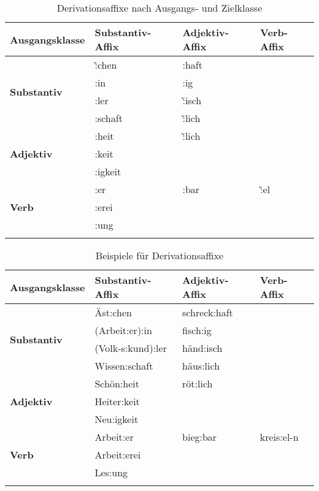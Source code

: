 \begin{table}
  \centering
  \begin{tabular}{llll}
    \lsptoprule
    \textbf{Ausgangsklasse} & \textbf{Substantiv-Affix} & \textbf{Adjektiv-Affix} & \textbf{Verb-Affix} \\
   \midrule
   \multirow{4}{*}{\textbf{Substantiv}} & \~:chen & :haft & \\
   & :in & :ig & \\
   & :ler & \~:isch & \\
   & :schaft & \~:lich & \\
   \midrule
   \multirow{3}{*}{\textbf{Adjektiv}} & :heit & \~:lich & \\
    & :keit && \\
    & :igkeit && \\
   \midrule
   \multirow{3}{*}{\textbf{Verb}} & :er & :bar & \~:el \\
   & :erei && \\
   & :ung && \\
   \lspbottomrule
  \end{tabular}
  \caption{Derivationsaffixe nach Ausgangs- und Zielklasse}
  \label{tab:derivaffixe}
\end{table}

\begin{table}
  \centering
  \begin{tabular}{llll}
    \lsptoprule
    \textbf{Ausgangsklasse} & \textbf{Substantiv-Affix} & \textbf{Adjektiv-Affix} & \textbf{Verb-Affix} \\
   \midrule
   \multirow{4}{*}{\textbf{Substantiv}} & Äst:chen & schreck:haft & \\
   & (Arbeit:er):in & fisch:ig & \\
   & (Volk-s:kund):ler & händ:isch & \\
   & Wissen:schaft & häus:lich & \\
   \midrule
   \multirow{3}{*}{\textbf{Adjektiv}} & Schön:heit & röt:lich & \\
    & Heiter:keit && \\
    & Neu:igkeit && \\
   \midrule
   \multirow{3}{*}{\textbf{Verb}} & Arbeit:er & bieg:bar & kreis:el-n \\
   & Arbeit:erei && \\
   & Les:ung && \\
   \lspbottomrule
  \end{tabular}
  \caption{Beispiele für Derivationsaffixe}
  \label{tab:derivaffixex}
\end{table}

